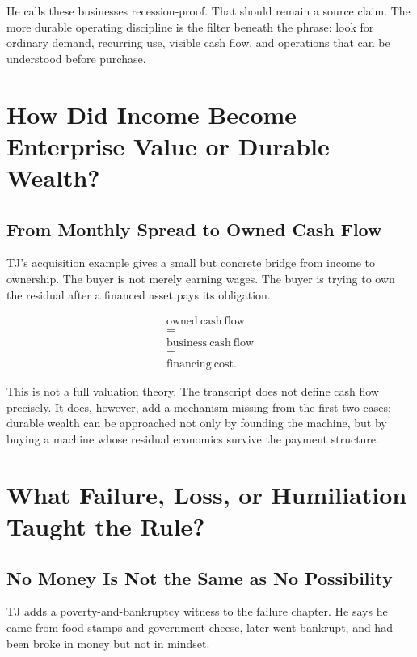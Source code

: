 \documentclass[11pt,oneside]{book}
\begin{document}
He calls these businesses recession-proof. That should remain a source claim. The more durable operating discipline is the filter beneath the phrase: look for ordinary demand, recurring use, visible cash flow, and operations that can be understood before purchase.

\chapter{How Did Income Become Enterprise Value or Durable Wealth?}

\section{From Monthly Spread to Owned Cash Flow}

TJ's acquisition example gives a small but concrete bridge from income to ownership. The buyer is not merely earning wages. The buyer is trying to own the residual after a financed asset pays its obligation.

\begin{equation}
\begin{gathered}
\mathrm{owned\ cash\ flow}\\
=\\
\mathrm{business\ cash\ flow}\\
-\\
\mathrm{financing\ cost}.
\end{gathered}
\end{equation}

This is not a full valuation theory. The transcript does not define cash flow precisely. It does, however, add a mechanism missing from the first two cases: durable wealth can be approached not only by founding the machine, but by buying a machine whose residual economics survive the payment structure.

\chapter{What Failure, Loss, or Humiliation Taught the Rule?}

\section{No Money Is Not the Same as No Possibility}

TJ adds a poverty-and-bankruptcy witness to the failure chapter. He says he came from food stamps and government cheese, later went bankrupt, and had been broke in money but not in mindset.
\end{document}
